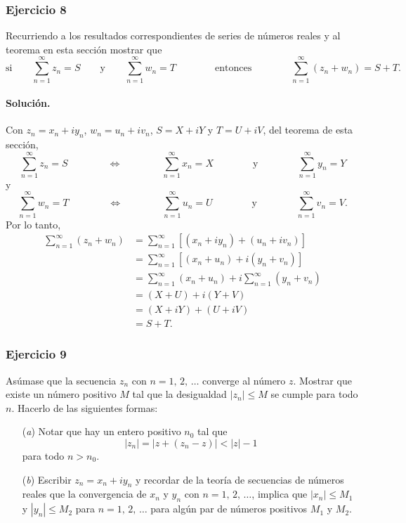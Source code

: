 \documentclass[a4paper]{report}
\begin{document}
\subsubsection{Ejercicio 8}

Recurriendo a los resultados correspondientes de series de números reales y al teorema en esta sección mostrar que 
\[
 \textrm{si}\qquad 
 \sum_{n=1}^\infty z_n=S
 \qquad\textrm{y}\qquad
 \sum_{n=1}^\infty w_n=T
 \qquad\qquad\textrm{entonces}\qquad\qquad
 \sum_{n=1}^\infty(z_n+w_n)=S+T.
\]

\paragraph{Solución.} Con \(z_n=x_n+iy_n\), \(w_n=u_n+iv_n\), \(S=X+iY\) y \(T=U+iV\), del teorema de esta sección, 
\[
 \sum_{n=1}^\infty z_n=S
 \qquad\qquad\Leftrightarrow\qquad\qquad
 \sum_{n=1}^\infty x_n=X
 \qquad\qquad\textrm{y}\qquad\qquad
 \sum_{n=1}^\infty y_n=Y
\]
y
\[
 \sum_{n=1}^\infty w_n=T
 \qquad\qquad\Leftrightarrow\qquad\qquad
 \sum_{n=1}^\infty u_n=U
 \qquad\qquad\textrm{y}\qquad\qquad
 \sum_{n=1}^\infty v_n=V.
\]
Por lo tanto,
\begin{align*}
 \sum_{n=1}^\infty(z_n+w_n)&=\sum_{n=1}^\infty[(x_n+iy_n)+(u_n+iv_n)]\\
  &=\sum_{n=1}^\infty[(x_n+u_n)+i(y_n+v_n)]\\ 
  &=\sum_{n=1}^\infty(x_n+u_n)+i\sum_{n=1}^\infty(y_n+v_n)\\ 
  &=(X+U)+i(Y+V)\\
  &=(X+iY)+(U+iV)\\
  &=S+T.
\end{align*}

\subsubsection{Ejercicio 9}

Asúmase que la secuencia \(z_n\) con \(n=1,\,2,\,\dots\) converge al número \(z\). Mostrar que existe un número positivo \(M\) tal que la desigualdad \(|z_n|\leq M\) se cumple para todo \(n\). Hacerlo de las siguientes formas:
\begin{enumerate}
 \item[(\textit{a})] Notar que hay un entero positivo \(n_0\) tal que 
 \[
  |z_n|=|z+(z_n-z)|<|z|-1
 \]
 para todo \(n>n_0\).
 \item[(\textit{b})] Escribir \(z_n=x_n+iy_n\) y recordar de la teoría de secuencias de números reales que la convergencia de \(x_n\) y \(y_n\) con \(n=1,\,2,\,\dots\), implica que \(|x_n|\leq M_1\) y \(|y_n|\leq M_2\) para \(n=1,\,2,\,\dots\) para algún par de números positivos \(M_1\) y \(M_2\).
\end{enumerate}
\end{document}
